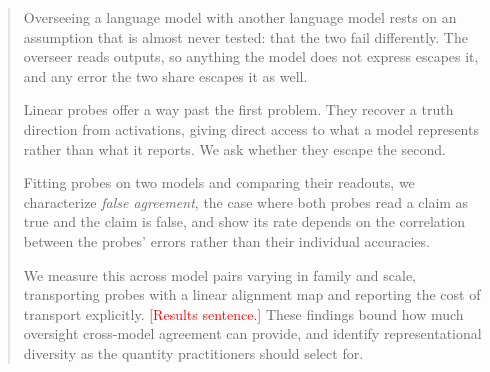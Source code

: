 %
\begin{abstract}
Overseeing a language model with another language model rests on an assumption
that is almost never tested: that the two fail differently. The overseer reads
outputs, so anything the model does not express escapes it, and any error the two
share escapes it as well.

Linear probes offer a way past the first problem. They recover a truth direction
from activations, giving direct access to what a model represents rather than
what it reports. We ask whether they escape the second.

Fitting probes on two models and comparing their readouts, we characterize
\emph{false agreement}, the case where both probes read a claim as true and the
claim is false, and show its rate depends on the correlation between the probes'
errors rather than their individual accuracies.

We measure this across model pairs varying in family and scale, transporting
probes with a linear alignment map and reporting the cost of transport
explicitly.
\textcolor{red}{[Results sentence.]}
These findings bound how much oversight cross-model agreement can provide, and
identify representational diversity as the quantity practitioners should select
for.
\end{abstract}
